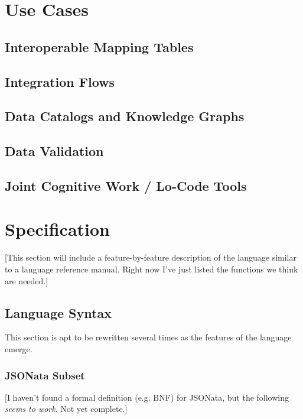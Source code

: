\documentclass[9pt,letterpaper]{article}
\begin{document}
\section{Use Cases}

\subsection{Interoperable Mapping Tables}

\subsection{Integration Flows}

\subsection{Data Catalogs and Knowledge Graphs}

\subsection{Data Validation}

\subsection{Joint Cognitive Work / Lo-Code Tools}

\section{Specification}

[This section will include a feature-by-feature description of the language similar to a language reference manual. Right now I've just listed the functions we think are needed.]

\subsection{Language Syntax}
This section is apt to be rewritten several times as the features of the language emerge.

\subsubsection{JSONata Subset}
[I haven't found a formal definition (e.g. BNF) for JSONata, but the following \textit{seems to work}. Not yet complete.]
\end{document}
